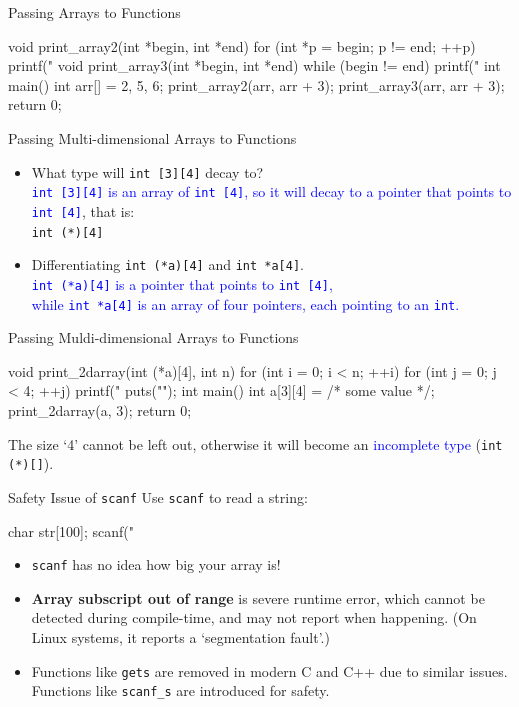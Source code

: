 \documentclass[handout]{beamer}
\newcommand{\blue}[1]{\textcolor{blue}{#1}}
\newcommand{\ttt}[1]{\texttt{#1}}
\begin{document}
\begin{frame}[fragile]{Passing Arrays to Functions}
	\begin{cpp}
void print_array2(int *begin, int *end) {
  for (int *p = begin; p != end; ++p)
    printf("%
}
void print_array3(int *begin, int *end) {
  while (begin != end)
    printf("%
}
int main() {
  int arr[] = {2, 5, 6};
  print_array2(arr, arr + 3);
  print_array3(arr, arr + 3);
  return 0;
}
	\end{cpp}
\end{frame}

\begin{frame}[fragile]{Passing Multi-dimensional Arrays to Functions}
	\begin{itemize}
		\item What type will \ttt{int [3][4]} decay to?\\
		\pause
		\blue{\ttt{int [3][4]} is an array of \ttt{int [4]}, so it will decay to a pointer that points to \ttt{int [4]}}, that is:\\
		\ttt{int (*)[4]}
		\pause
		\item Differentiating \ttt{int (*a)[4]} and \ttt{int *a[4]}.\\
		\blue{\ttt{int (*a)[4]} is a pointer that points to \ttt{int [4]},\\
		while \ttt{int *a[4]} is an array of four pointers, each pointing to an \ttt{int}.}
	\end{itemize}
\end{frame}

\begin{frame}[fragile]{Passing Muldi-dimensional Arrays to Functions}
	\begin{cpp}
void print_2darray(int (*a)[4], int n) {
  for (int i = 0; i < n; ++i) {
    for (int j = 0; j < 4; ++j)
      printf("%
    puts("");
  }
}
int main() {
  int a[3][4] = /* some value */;
  print_2darray(a, 3);
  return 0;
}
	\end{cpp}
	The size `4' cannot be left out, otherwise it will become an \blue{incomplete type} (\ttt{int (*)[]}).
\end{frame}

\begin{frame}[fragile]{Safety Issue of \ttt{scanf}}
	Use \ttt{scanf} to read a string:
	\begin{cpp}
char str[100];
scanf("%
	\end{cpp}
	\pause
	\begin{itemize}
		\item \ttt{scanf} has no idea how big your array is!
		\item \textbf{Array subscript out of range} is severe runtime error, which cannot be detected during compile-time, and may not report when happening. (On Linux systems, it reports a `segmentation fault'.)
		\pause
		\item Functions like \ttt{gets} are removed in modern C and C++ due to similar issues. Functions like \ttt{scanf\_s} are introduced for safety.
	\end{itemize}
\end{frame}
\end{document}
